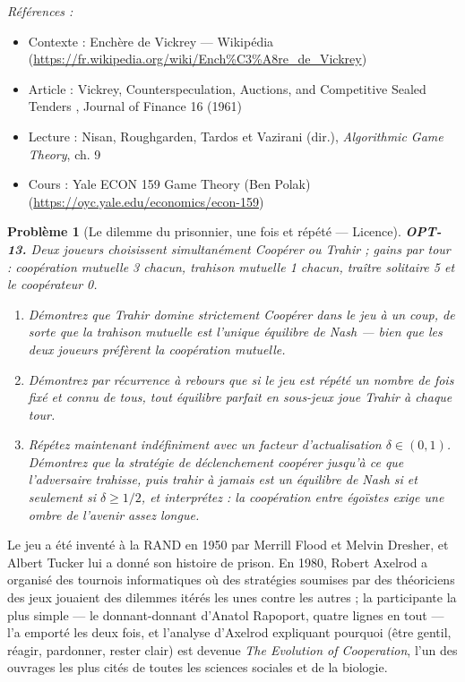 \documentclass[11pt]{article}
\newtheorem{problem}{Problème}
\newenvironment{refs}{\par\small\noindent\emph{Références :}\begin{itemize}\setlength\itemsep{0pt}}{\end{itemize}\normalsize}
\begin{document}
\begin{refs}
\item Contexte : Enchère de Vickrey --- Wikipédia (\url{https://fr.wikipedia.org/wiki/Ench%C3%A8re_de_Vickrey})
\item Article : Vickrey, \og{} Counterspeculation, Auctions, and Competitive Sealed Tenders \fg{}, Journal of Finance 16 (1961)
\item Lecture : Nisan, Roughgarden, Tardos et Vazirani (dir.), \textit{Algorithmic Game Theory}, ch. 9
\item Cours : Yale ECON 159 Game Theory (Ben Polak) (\url{https://oyc.yale.edu/economics/econ-159})
\end{refs}

\bigskip

\begin{problem}[{Le dilemme du prisonnier, une fois et répété --- Licence}]
\textbf{OPT-13.} Deux joueurs choisissent simultanément Coopérer ou Trahir ; gains par tour : coopération mutuelle 3 chacun, trahison mutuelle 1 chacun, traître solitaire 5 et le coopérateur 0.
\begin{enumerate}
\item[(a)] Démontrez que Trahir domine strictement Coopérer dans le jeu à un coup, de sorte que la trahison mutuelle est l'unique équilibre de Nash --- bien que les deux joueurs préfèrent la coopération mutuelle.
\item[(b)] Démontrez par récurrence à rebours que si le jeu est répété un nombre de fois fixé et connu de tous, tout équilibre parfait en sous-jeux joue Trahir à chaque tour.
\item[(c)] Répétez maintenant indéfiniment avec un facteur d'actualisation $\delta \in (0,1)$. Démontrez que la stratégie de déclenchement \og{} coopérer jusqu'à ce que l'adversaire trahisse, puis trahir à jamais \fg{} est un équilibre de Nash si et seulement si $\delta \ge 1/2$, et interprétez : la coopération entre égoïstes exige une ombre de l'avenir assez longue.
\end{enumerate}

\end{problem}

\noindent Le jeu a été inventé à la RAND en 1950 par Merrill Flood et Melvin Dresher, et Albert Tucker lui a donné son histoire de prison. En 1980, Robert Axelrod a organisé des tournois informatiques où des stratégies soumises par des théoriciens des jeux jouaient des dilemmes itérés les unes contre les autres ; la participante la plus simple --- le donnant-donnant d'Anatol Rapoport, quatre lignes en tout --- l'a emporté les deux fois, et l'analyse d'Axelrod expliquant pourquoi (être gentil, réagir, pardonner, rester clair) est devenue \textit{The Evolution of Cooperation}, l'un des ouvrages les plus cités de toutes les sciences sociales et de la biologie.
\end{document}
